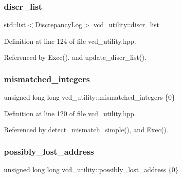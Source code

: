 \subsubsection{\texorpdfstring{discr\+\_\+list}{discr\_list}}
{\footnotesize\ttfamily std\+::list$<$\hyperlink{structDiscrepancyLog}{Discrepancy\+Log}$>$ vcd\+\_\+utility\+::discr\+\_\+list\hspace{0.3cm}{\ttfamily [protected]}}



Definition at line 124 of file vcd\+\_\+utility.\+hpp.



Referenced by Exec(), and update\+\_\+discr\+\_\+list().

\mbox{\label{classvcd__utility_a5f365402f79dfa5cf2fe7f91745f8d8b}} 
\subsubsection{\texorpdfstring{mismatched\+\_\+integers}{mismatched\_integers}}
{\footnotesize\ttfamily unsigned long long vcd\+\_\+utility\+::mismatched\+\_\+integers \{0\}\hspace{0.3cm}{\ttfamily [protected]}}



Definition at line 120 of file vcd\+\_\+utility.\+hpp.



Referenced by detect\+\_\+mismatch\+\_\+simple(), and Exec().

\mbox{\label{classvcd__utility_abda11f233eaef57efb5530f3a4d2e96c}} 
\subsubsection{\texorpdfstring{possibly\+\_\+lost\+\_\+address}{possibly\_lost\_address}}
{\footnotesize\ttfamily unsigned long long vcd\+\_\+utility\+::possibly\+\_\+lost\+\_\+address \{0\}\hspace{0.3cm}{\ttfamily [protected]}}




